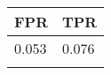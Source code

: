 \begin{tabular}{ll}
\hline
 FPR   & TPR   \\
\hline
 0.053 & 0.076 \\
       &       \\
\hline
\end{tabular}